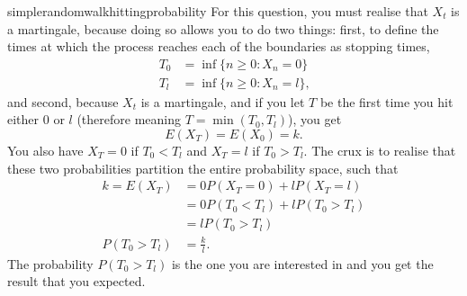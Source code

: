 \begin{answer}{simplerandomwalkhittingprobability}
For this question, you must realise that $X_t$ is a martingale, because doing so allows you to do two things: first, to define the times at which the process reaches each of the boundaries as stopping times,
\begin{align*}
  T_0 &= \inf\{ n \geq 0: X_n = 0\} \\
  T_l &= \inf\{ n \geq 0: X_n = l\}
  \text{,}
\end{align*}
and second, because $X_t$ is a martingale, and if you let $T$ be the first time you hit either $0$ or $l$ (therefore meaning $T = \min(T_0 , T_l)$), you get
\[
E(X_T) =  E(X_0) = k
\text{.}
\]
You also have
$X_T=0$ if $T_0 < T_l$
and
$X_T=l$ if $T_0 > T_l$.
The crux is to realise that these two probabilities partition the entire probability space, such that
\begin{align*}
k = E(X_T) &=  0 P(X_T =  0 ) + l P(X_T = l  ) \\
           &=  0 P(T_0 < T_l) + l P(T_0 > T_l) \\
           &=  l P(T_0 > T_l)  \\
P(T_0 > T_l) &= \frac{k}{l}
\text{.}
\end{align*}
The probability $P(T_0 > T_l)$ is the one you are interested in and you get the result that you expected.
\end{answer}
